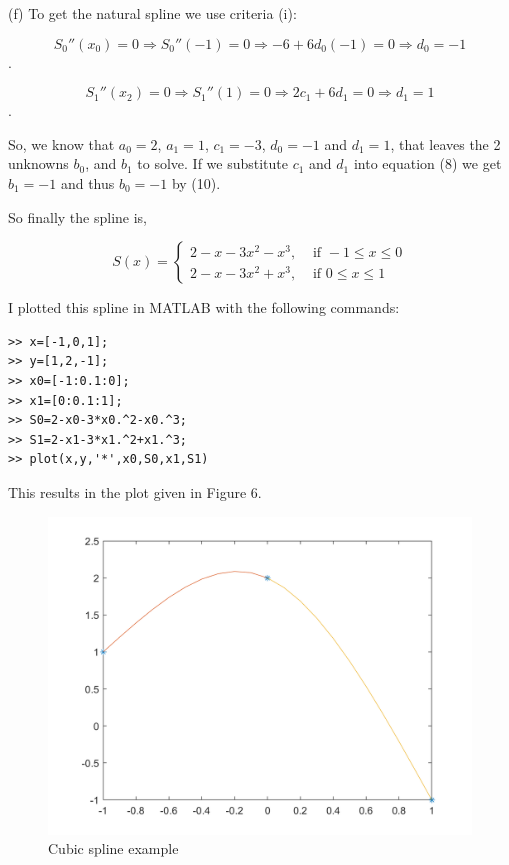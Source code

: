 \documentclass [titlepage,12pt,letter] {article}
\begin{document}
(f) To get the natural spline we use criteria (i):

\begin{equation}S_0''(x_0)=0 \Rightarrow S_0''(-1) = 0 \Rightarrow -6+6d_0(-1)=0 \Rightarrow \boxed{d_0=-1}\end{equation}.

\begin{equation}S_1''(x_2)=0 \Rightarrow S_1''(1)=0 \Rightarrow 2c_1+6d_1=0 \Rightarrow \boxed{d_1=1}\end{equation}.

So, we know that $a_0=2$, $a_1=1$, $c_1=-3$, $d_0=-1$ and $d_1=1$, that leaves the 2 unknowns $b_0$, and $b_1$ to solve. If we substitute $c_1$ and $d_1$ into equation (8) we get $b_1=-1$ and thus $b_0=-1$ by (10).

So finally the spline is,

\[
S(x) = \begin{cases}
2-x-3x^2-x^3, & \text{ if } -1 \leq x \leq 0 \\
2-x-3x^2+x^3, & \text{ if } 0 \leq x \leq 1
\end{cases}
\]

I plotted this spline in MATLAB with the following commands:

\begin{verbatim}
>> x=[-1,0,1];
>> y=[1,2,-1];
>> x0=[-1:0.1:0];
>> x1=[0:0.1:1];
>> S0=2-x0-3*x0.^2-x0.^3;
>> S1=2-x1-3*x1.^2+x1.^3;
>> plot(x,y,'*',x0,S0,x1,S1)
\end{verbatim}

\noindent
This results in the plot given in Figure 6.

\begin{figure} 
  \centering
  \includegraphics[scale=0.3]{lect14CubSpline}
  \caption{Cubic spline example}
  \label{fig:CubSpline}
\end{figure}
\end{document}
